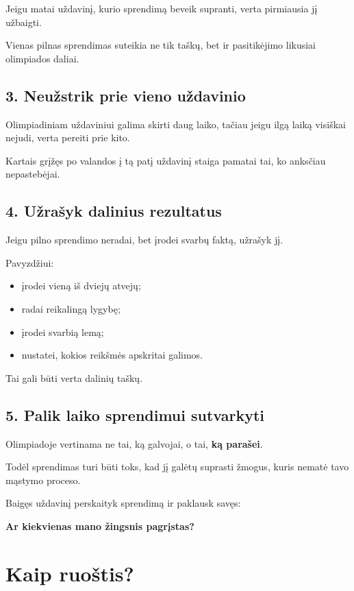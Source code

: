 \documentclass[11pt,a4paper]{article}
\begin{document}
Jeigu matai uždavinį, kurio sprendimą beveik supranti, verta pirmiausia jį užbaigti.

Vienas pilnas sprendimas suteikia ne tik taškų, bet ir pasitikėjimo likusiai olimpiados daliai.

\subsection{3. Neužstrik prie vieno uždavinio}

Olimpiadiniam uždaviniui galima skirti daug laiko, tačiau jeigu ilgą laiką visiškai nejudi, verta pereiti prie kito.

Kartais grįžęs po valandos į tą patį uždavinį staiga pamatai tai, ko anksčiau nepastebėjai.

\subsection{4. Užrašyk dalinius rezultatus}

Jeigu pilno sprendimo neradai, bet įrodei svarbų faktą, užrašyk jį.

Pavyzdžiui:
\begin{itemize}
  \item įrodei vieną iš dviejų atvejų;
  \item radai reikalingą lygybę;
  \item įrodei svarbią lemą;
  \item nustatei, kokios reikšmės apskritai galimos.
\end{itemize}

Tai gali būti verta dalinių taškų.

\subsection{5. Palik laiko sprendimui sutvarkyti}

Olimpiadoje vertinama ne tai, ką galvojai, o tai, \textbf{ką parašei}.

Todėl sprendimas turi būti toks, kad jį galėtų suprasti žmogus, kuris nematė tavo mąstymo proceso.

Baigęs uždavinį perskaityk sprendimą ir paklausk savęs:

\begin{center}
\textbf{Ar kiekvienas mano žingsnis pagrįstas?}
\end{center}

\section{Kaip ruoštis?}
\end{document}
